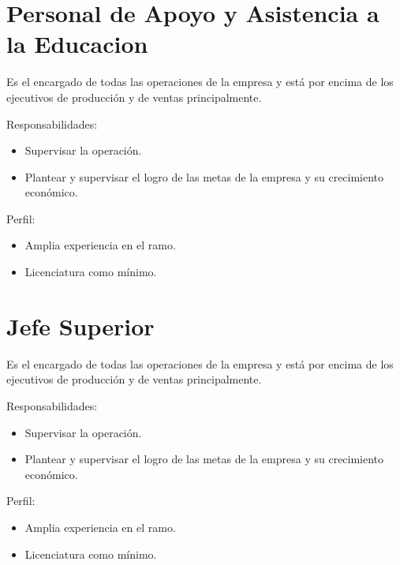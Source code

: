 \begin{Actor}{\hypertarget{Actor: Personal PAAE}{\section{Personal de Apoyo y Asistencia a la Educacion}}}{
	Es el encargado de todas las operaciones de la empresa y está por encima de los ejecutivos de producción y de ventas principalmente.
}
    \item[Responsabilidades:] \ISenter
    \begin{itemize}
		\item Supervisar la operación.
		\item Plantear y supervisar el logro de las metas de la empresa y su crecimiento económico.
    \end{itemize}

	\item[Perfil:] \ISenter
    \begin{itemize}
		\item Amplia experiencia en el ramo.
		\item Licenciatura como mínimo.
    \end{itemize}
\end{Actor}
\begin{Actor}{\hypertarget{Actor: Jefe Superior}{\section{Jefe Superior}}}{
	Es el encargado de todas las operaciones de la empresa y está por encima de los ejecutivos de producción y de ventas principalmente.
}
    \item[Responsabilidades:] \ISenter
    \begin{itemize}
		\item Supervisar la operación.
		\item Plantear y supervisar el logro de las metas de la empresa y su crecimiento económico.
    \end{itemize}

	\item[Perfil:] \ISenter
    \begin{itemize}
		\item Amplia experiencia en el ramo.
		\item Licenciatura como mínimo.
    \end{itemize}
\end{Actor}
